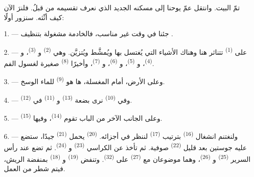 %
%

\VUsaut{6.0mm}
\VUsaut{1.4mm}
\VUsaut{0.4mm}
\VUsaut{2.2mm}

تمّ البيت. وانتقل عمّ يوحنا إلى مسكنه الجديد الذي نعرف تقسيمه من قبلُ.
فلنرَ الآن كيف أثّثه. سنزور أولًا:

\VUsaut{3.0mm}

1. --- جئنا في وقت غير مناسب، فالخادمة مشغولة بتنظيف .

2. --- على  \textsuperscript{(1)} تتناثر هنا وهناك الأشياء التي
يُغتسل بها ويُمشَّط ويُتزيَّن. وهي  \textsuperscript{(2)}
و \textsuperscript{(3)}، و
\textsuperscript{(4)}، و \textsuperscript{(5)}، و
\textsuperscript{(6)}، و \textsuperscript{(7)}، وأخيرًا
 \textsuperscript{(8)} صغيرة لغسول الفم.

3. --- وعلى الأرض، أمام المغسلة، ها هو  \textsuperscript{(9)} للماء
الوسخ.

4. --- وفي  \textsuperscript{(10)} نرى بضعة
 \textsuperscript{(13)} و \textsuperscript{(11)} في
 \textsuperscript{(12)}.

5. --- وعلى الجانب الآخر من الباب تقوم 
\textsuperscript{(14)}، وفيها  \textsuperscript{(15)}.

6. --- ولنغتنم انشغال  \textsuperscript{(16)} بترتيب
 \textsuperscript{(17)} لننظر في أجزائه. 
\textsuperscript{(20)} يحمل  \textsuperscript{(21)} جيدًا،
ستضع عليه جوستين بعد قليل  \textsuperscript{(22)} صوفية. ثم تأخذ
عن الكراسي  \textsuperscript{(23)} و
\textsuperscript{(24)}. ثم تضع عند رأس السرير  \textsuperscript{(25)}
و \textsuperscript{(26)}، وهما موضوعان مع 
\textsuperscript{(27)} على  \textsuperscript{(32)}. وتنفض
 \textsuperscript{(19)} و \textsuperscript{(18)}
بمنفضة الريش، فيتم شطر من العمل.

